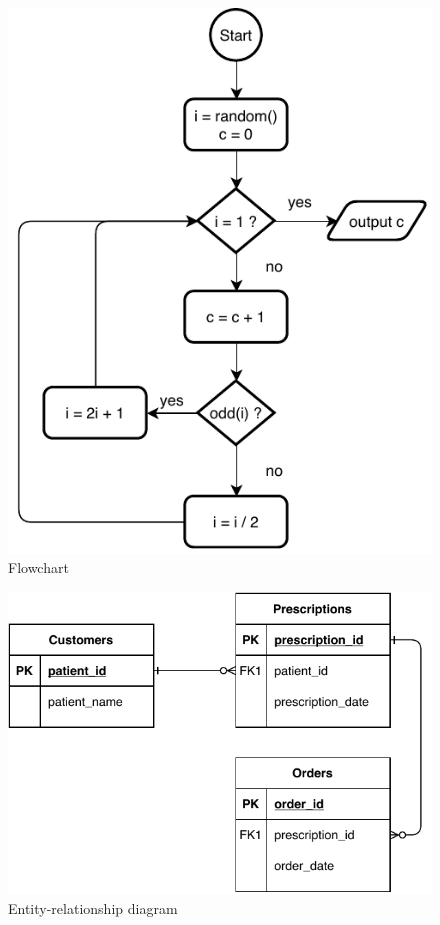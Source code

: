 \documentclass[10pt,letterpaper]{article}
\begin{document}
\begin{figure}
  \centering
  \includegraphics[scale=0.6]{flowchart.pdf}
  \caption{Flowchart}
  \label{flowchart}
\end{figure}

\begin{figure}
  \centering
  \includegraphics[scale=0.6]{er-diagram.pdf}
  \caption{Entity-relationship diagram}
  \label{er-diagram}
\end{figure}
\end{document}
